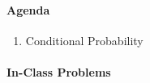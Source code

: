 \documentclass[10pt]{article}\usepackage[]{graphicx}\usepackage[]{color}
\begin{document}
\paragraph{Agenda}
\begin{enumerate}
  \itemsep0em
  \item Conditional Probability
\end{enumerate}


\paragraph{In-Class Problems}

%   
%   
% 
%   
%   
\end{document}
